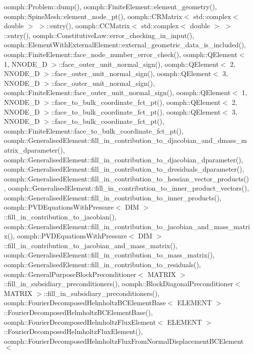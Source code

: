 oomph\+::\+Problem\+::dump(), oomph\+::\+Finite\+Element\+::element\+\_\+geometry(), oomph\+::\+Spine\+Mesh\+::element\+\_\+node\+\_\+pt(), oomph\+::\+C\+R\+Matrix$<$ std\+::complex$<$ double $>$ $>$\+::entry(), oomph\+::\+C\+C\+Matrix$<$ std\+::complex$<$ double $>$ $>$\+::entry(), oomph\+::\+Constitutive\+Law\+::error\+\_\+checking\+\_\+in\+\_\+input(), oomph\+::\+Element\+With\+External\+Element\+::external\+\_\+geometric\+\_\+data\+\_\+is\+\_\+included(), oomph\+::\+Finite\+Element\+::face\+\_\+node\+\_\+number\+\_\+error\+\_\+check(), oomph\+::\+Q\+Element$<$ 1, N\+N\+O\+D\+E\+\_\+D $>$\+::face\+\_\+outer\+\_\+unit\+\_\+normal\+\_\+sign(), oomph\+::\+Q\+Element$<$ 2, N\+N\+O\+D\+E\+\_\+D $>$\+::face\+\_\+outer\+\_\+unit\+\_\+normal\+\_\+sign(), oomph\+::\+Q\+Element$<$ 3, N\+N\+O\+D\+E\+\_\+D $>$\+::face\+\_\+outer\+\_\+unit\+\_\+normal\+\_\+sign(), oomph\+::\+Finite\+Element\+::face\+\_\+outer\+\_\+unit\+\_\+normal\+\_\+sign(), oomph\+::\+Q\+Element$<$ 1, N\+N\+O\+D\+E\+\_\+D $>$\+::face\+\_\+to\+\_\+bulk\+\_\+coordinate\+\_\+fct\+\_\+pt(), oomph\+::\+Q\+Element$<$ 2, N\+N\+O\+D\+E\+\_\+D $>$\+::face\+\_\+to\+\_\+bulk\+\_\+coordinate\+\_\+fct\+\_\+pt(), oomph\+::\+Q\+Element$<$ 3, N\+N\+O\+D\+E\+\_\+D $>$\+::face\+\_\+to\+\_\+bulk\+\_\+coordinate\+\_\+fct\+\_\+pt(), oomph\+::\+Finite\+Element\+::face\+\_\+to\+\_\+bulk\+\_\+coordinate\+\_\+fct\+\_\+pt(), oomph\+::\+Generalised\+Element\+::fill\+\_\+in\+\_\+contribution\+\_\+to\+\_\+djacobian\+\_\+and\+\_\+dmass\+\_\+matrix\+\_\+dparameter(), oomph\+::\+Generalised\+Element\+::fill\+\_\+in\+\_\+contribution\+\_\+to\+\_\+djacobian\+\_\+dparameter(), oomph\+::\+Generalised\+Element\+::fill\+\_\+in\+\_\+contribution\+\_\+to\+\_\+dresiduals\+\_\+dparameter(), oomph\+::\+Generalised\+Element\+::fill\+\_\+in\+\_\+contribution\+\_\+to\+\_\+hessian\+\_\+vector\+\_\+products(), oomph\+::\+Generalised\+Element\+::fill\+\_\+in\+\_\+contribution\+\_\+to\+\_\+inner\+\_\+product\+\_\+vectors(), oomph\+::\+Generalised\+Element\+::fill\+\_\+in\+\_\+contribution\+\_\+to\+\_\+inner\+\_\+products(), oomph\+::\+P\+V\+D\+Equations\+With\+Pressure$<$ D\+I\+M $>$\+::fill\+\_\+in\+\_\+contribution\+\_\+to\+\_\+jacobian(), oomph\+::\+Generalised\+Element\+::fill\+\_\+in\+\_\+contribution\+\_\+to\+\_\+jacobian\+\_\+and\+\_\+mass\+\_\+matrix(), oomph\+::\+P\+V\+D\+Equations\+With\+Pressure$<$ D\+I\+M $>$\+::fill\+\_\+in\+\_\+contribution\+\_\+to\+\_\+jacobian\+\_\+and\+\_\+mass\+\_\+matrix(), oomph\+::\+Generalised\+Element\+::fill\+\_\+in\+\_\+contribution\+\_\+to\+\_\+mass\+\_\+matrix(), oomph\+::\+Generalised\+Element\+::fill\+\_\+in\+\_\+contribution\+\_\+to\+\_\+residuals(), oomph\+::\+General\+Purpose\+Block\+Preconditioner$<$ M\+A\+T\+R\+I\+X $>$\+::fill\+\_\+in\+\_\+subsidiary\+\_\+preconditioners(), oomph\+::\+Block\+Diagonal\+Preconditioner$<$ M\+A\+T\+R\+I\+X $>$\+::fill\+\_\+in\+\_\+subsidiary\+\_\+preconditioners(), oomph\+::\+Fourier\+Decomposed\+Helmholtz\+B\+C\+Element\+Base$<$ E\+L\+E\+M\+E\+N\+T $>$\+::\+Fourier\+Decomposed\+Helmholtz\+B\+C\+Element\+Base(), oomph\+::\+Fourier\+Decomposed\+Helmholtz\+Flux\+Element$<$ E\+L\+E\+M\+E\+N\+T $>$\+::\+Fourier\+Decomposed\+Helmholtz\+Flux\+Element(), oomph\+::\+Fourier\+Decomposed\+Helmholtz\+Flux\+From\+Normal\+Displacement\+B\+C\+Element$<$ 